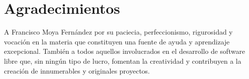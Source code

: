 



\chapter*{Agradecimientos}

\thispagestyle{empty} 				%


A Francisco Moya Fernández por su paciecia, perfeccionismo, rigurosidad y vocación en la materia que constituyen una fuente de ayuda y aprendizaje excepcional. También a todos aquellos involucrados en el desarrollo de software libre que, sin ningún tipo de lucro, fomentan la creatividad y contribuyen a la creación de innumerables y originales proyectos.

\cleardoublepage
